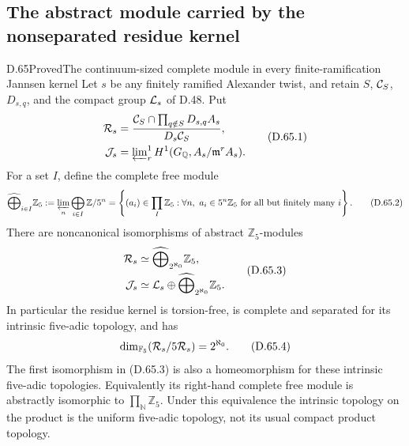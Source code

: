\subsection{The abstract module carried by the nonseparated residue kernel}

\begin{statement}{D.65}{Proved}{The continuum-sized complete module in every finite-ramification Jannsen kernel}
Let \(s\) be any finitely ramified Alexander twist, and
retain \(S\), \({\cal C}_S\), \(D_{s,q}\), and the compact
group \({\cal L}_s\) of D.48. Put
\[
 \begin{split}
 {\cal R}_s&=
  \frac{{\cal C}_S\cap\prod_{q\notin S}D_{s,q}A_s}
       {D_s{\cal C}_S},\\
 {\cal J}_s&=\varprojlim\nolimits_r^1
                         H^1(G_{\mathbb Q},A_s/\mathfrak m^rA_s).
 \end{split}                                             \tag{D.65.1}
\]
For a set \(I\), define the complete free module
\[
 \widehat{\bigoplus}_{i\in I}\mathbb Z_5
   :=\varprojlim_n\bigoplus_{i\in I}\mathbb Z/5^n
   =\left\{(a_i)\in\prod_I\mathbb Z_5:
       \forall n,\ a_i\in5^n\mathbb Z_5
                         \text{ for all but finitely many }i\right\}.
                                                        \tag{D.65.2}
\]
There are noncanonical isomorphisms of abstract
\(\mathbb Z_5\)-modules
\[
 \begin{split}
 {\cal R}_s&\simeq
              \widehat{\bigoplus}_{2^{\aleph_0}}\mathbb Z_5,\\
 {\cal J}_s&\simeq {\cal L}_s\oplus
              \widehat{\bigoplus}_{2^{\aleph_0}}\mathbb Z_5.
 \end{split}                                             \tag{D.65.3}
\]
In particular the residue kernel is torsion-free, is
complete and separated for its intrinsic five-adic
topology, and has
\[
           \dim_{\mathbb F_5}({\cal R}_s/5{\cal R}_s)
                                      =2^{\aleph_0}.
                                                        \tag{D.65.4}
\]
The first isomorphism in (D.65.3) is also a homeomorphism
for these intrinsic five-adic topologies.
Equivalently its right-hand complete free module is
abstractly isomorphic to \(\prod_{\mathbb N}\mathbb Z_5\).
Under this equivalence the intrinsic topology on the
product is the uniform five-adic topology, not its
usual compact product topology.


\end{statement}
